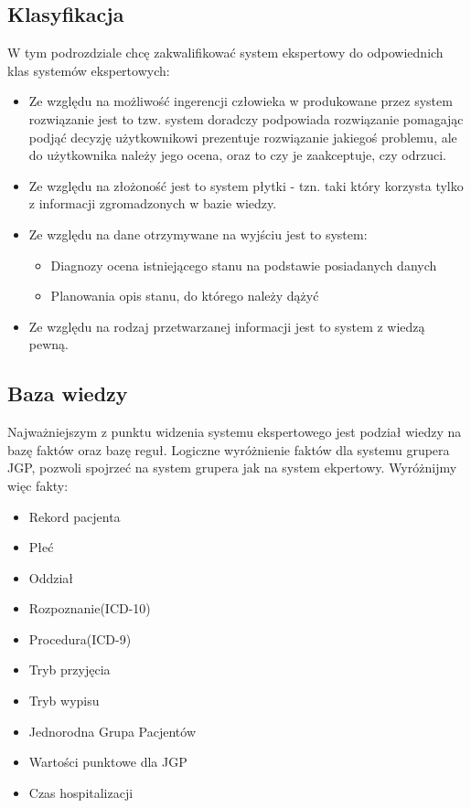 \subsection{Klasyfikacja}
\label{sec:klasyfikacjaSystemuEkspertowego}
W tym podrozdziale chcę zakwalifikować system ekspertowy do odpowiednich klas systemów ekspertowych:
\begin{itemize}
 \item Ze względu na możliwość ingerencji człowieka w produkowane przez system rozwiązanie jest to tzw. system doradczy \textendash{} podpowiada rozwiązanie pomagając podjąć decyzję użytkownikowi \textendash{} prezentuje rozwiązanie jakiegoś problemu, ale do użytkownika należy jego ocena, oraz to czy je zaakceptuje, czy odrzuci.
 \item Ze względu na złożoność jest to system płytki - tzn. taki który korzysta tylko z informacji zgromadzonych w bazie wiedzy.
 \item Ze względu na dane otrzymywane na wyjściu jest to system:
   \begin{itemize}
    \item Diagnozy \textendash{} ocena istniejącego stanu na podstawie posiadanych danych
    \item Planowania \textendash{} opis stanu, do którego należy dążyć
   \end{itemize}
 \item Ze względu na rodzaj przetwarzanej informacji jest to system z wiedzą pewną.
\end{itemize}

\subsection{Baza wiedzy}
\label{sec:bazaWiedzy}
Najważniejszym z punktu widzenia systemu ekspertowego jest podział wiedzy na bazę faktów oraz bazę reguł. Logiczne wyróżnienie faktów dla systemu grupera JGP, pozwoli spojrzeć na system grupera jak na system ekpertowy. Wyróżnijmy więc fakty:
\begin{itemize}
 \item Rekord pacjenta
 \item Płeć
 \item Oddział
 \item Rozpoznanie(ICD-10)
 \item Procedura(ICD-9)
 \item Tryb przyjęcia
 \item Tryb wypisu
 \item Jednorodna Grupa Pacjentów
 \item Wartości punktowe dla JGP
 \item Czas hospitalizacji
\end{itemize}

